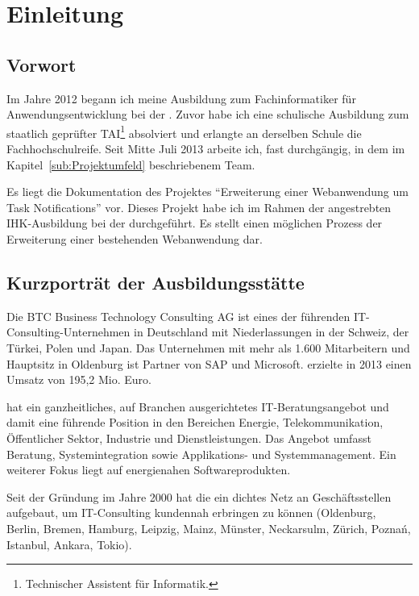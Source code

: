 \section{Einleitung}
\label{sec:Einleitung}

\subsection{Vorwort} 
\label{sub:Vorwort}
Im Jahre 2012 begann ich meine Ausbildung zum Fachinformatiker für Anwendungsentwicklung bei der . Zuvor
habe ich eine schulische Ausbildung zum staatlich geprüfter TAI\footnote{Technischer Assistent für Informatik.} absolviert und
erlangte an derselben Schule die Fachhochschulreife. Seit Mitte Juli 2013 arbeite ich, fast durchgängig, in dem im
Kapitel~\ref{sub:Projektumfeld} beschriebenem Team.

Es liegt die Dokumentation des Projektes "`Erweiterung einer Webanwendung um Task Notifications"' vor. Dieses Projekt habe ich im
Rahmen der angestrebten IHK-Ausbildung bei der  durchgeführt. Es stellt einen möglichen Prozess der Erweiterung
einer bestehenden Webanwendung dar.

\subsection{Kurzporträt der Ausbildungsstätte} 
\label{sub:Kurzporträt der Ausbildungsstätte}
Die BTC Business Technology Consulting AG ist eines der führenden IT-Consulting-Unternehmen in Deutschland mit
Niederlassungen in der Schweiz, der Türkei, Polen und Japan. Das Unternehmen mit mehr als 1.600 Mitarbeitern und Hauptsitz in
Oldenburg ist Partner von SAP und Microsoft.  erzielte in 2013 einen Umsatz von 195,2 Mio. Euro.

 hat ein ganzheitliches, auf Branchen ausgerichtetes IT-Beratungsangebot und damit eine führende Position in den
Bereichen Energie, Telekommunikation, Öffentlicher Sektor, Industrie und Dienstleistungen. Das Angebot umfasst Beratung,
Systemintegration sowie Applikations- und Systemmanagement. Ein weiterer Fokus liegt auf energienahen Softwareprodukten.

Seit der Gründung im Jahre 2000 hat die  ein dichtes Netz an Geschäftsstellen aufgebaut, um IT-Consulting kundennah
erbringen zu können (Oldenburg, Berlin, Bremen, Hamburg, Leipzig, Mainz, Münster, Neckarsulm, Zürich, Poznań, Istanbul, Ankara,
Tokio). \citep{BTC}

